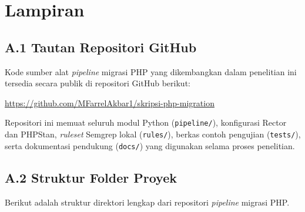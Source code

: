 \chapter*{Lampiran}
{}
\label{app:github-repository}

\section*{A.1 Tautan Repositori GitHub}

Kode sumber alat \textit{pipeline} migrasi PHP yang dikembangkan dalam
penelitian ini tersedia secara publik di repositori GitHub berikut:

\begin{center}
  \url{https://github.com/MFarrelAkbar1/skripsi-php-migration}
\end{center}

Repositori ini memuat seluruh modul Python (\texttt{pipeline/}), konfigurasi
Rector dan PHPStan, \textit{ruleset} Semgrep lokal (\texttt{rules/}),
berkas contoh pengujian (\texttt{tests/}), serta dokumentasi pendukung
(\texttt{docs/}) yang digunakan selama proses penelitian.

\section*{A.2 Struktur Folder Proyek}

Berikut adalah struktur direktori lengkap dari repositori
\textit{pipeline} migrasi PHP.

